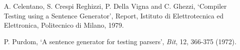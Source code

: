 \documentclass[a4paper,12pt]{article}
\begin{document}
\begin{thebibliography}{}

A. Celentano, S. Crespi Reghizzi, P. Della Vigna and C. Ghezzi, `Compiler Testing using a Sentence Generator', Report, Istituto di Elettrotecnica ed Elettronica, Politecnico di Milano, 1979.

P. Purdom, `A sentence generator for testing parsers', \emph{Bit}, 12, 366-375 (1972).

\end{thebibliography}
\end{document}
